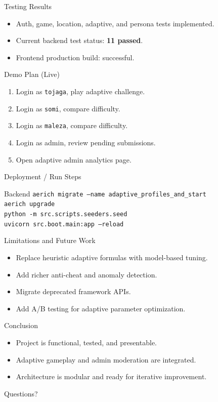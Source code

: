 \documentclass[aspectratio=169]{beamer}
\begin{document}
\begin{frame}{Testing Results}
  \begin{itemize}
    \item Auth, game, location, adaptive, and persona tests implemented.
    \item Current backend test status: \textbf{11 passed}.
    \item Frontend production build: successful.
  \end{itemize}
\end{frame}

\begin{frame}{Demo Plan (Live)}
  \begin{enumerate}
    \item Login as \texttt{tojaga}, play adaptive challenge.
    \item Login as \texttt{somi}, compare difficulty.
    \item Login as \texttt{maleza}, compare difficulty.
    \item Login as admin, review pending submissions.
    \item Open adaptive admin analytics page.
  \end{enumerate}
\end{frame}

\begin{frame}{Deployment / Run Steps}
  \begin{block}{Backend}
    \texttt{aerich migrate --name adaptive\_profiles\_and\_start}\\
    \texttt{aerich upgrade}\\
    \texttt{python -m src.scripts.seeders.seed}\\
    \texttt{uvicorn src.boot.main:app --reload}
  \end{block}
\end{frame}

\begin{frame}{Limitations and Future Work}
  \begin{itemize}
    \item Replace heuristic adaptive formulas with model-based tuning.
    \item Add richer anti-cheat and anomaly detection.
    \item Migrate deprecated framework APIs.
    \item Add A/B testing for adaptive parameter optimization.
  \end{itemize}
\end{frame}

\begin{frame}{Conclusion}
  \begin{itemize}
    \item Project is functional, tested, and presentable.
    \item Adaptive gameplay and admin moderation are integrated.
    \item Architecture is modular and ready for iterative improvement.
  \end{itemize}
\end{frame}

\begin{frame}
  \centering
  \Large Questions?
\end{frame}
\end{document}
